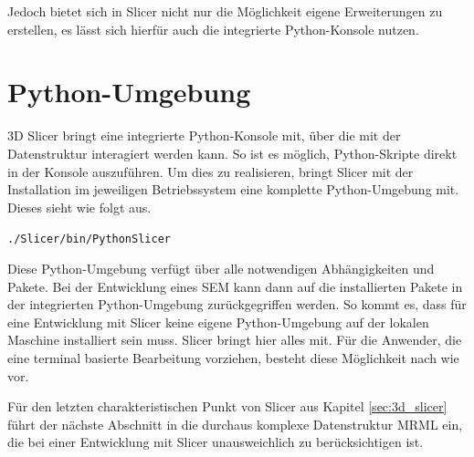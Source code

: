 Jedoch bietet sich in Slicer nicht nur die Möglichkeit eigene Erweiterungen zu erstellen,
es lässt sich hierfür auch die integrierte Python-Konsole nutzen.

\section{Python-Umgebung}
\label{subsec:pythob_umgebung} 3D Slicer bringt eine integrierte Python-Konsole
mit, über die mit der Datenstruktur interagiert werden kann. So ist es möglich, Python-Skripte
direkt in der Konsole auszuführen. Um dies zu realisieren, bringt Slicer mit der
Installation im jeweiligen Betriebssystem eine komplette Python-Umgebung mit.
Dieses sieht wie folgt aus.

\begin{center}
	\texttt{./Slicer/bin/PythonSlicer}
\end{center}

Diese Python-Umgebung verfügt über alle notwendigen Abhängigkeiten und Pakete.
Bei der Entwicklung eines \ac{SEM} kann dann auf die installierten Pakete in der
integrierten Python-Umgebung zurückgegriffen werden. So kommt es, dass für eine Entwicklung
mit Slicer keine eigene Python-Umgebung auf der lokalen Maschine installiert sein
muss. Slicer bringt hier alles mit. Für die Anwender, die eine terminal basierte
Bearbeitung vorziehen, besteht diese Möglichkeit nach wie vor.

Für den letzten charakteristischen Punkt von Slicer aus Kapitel \ref{sec:3d_slicer}
führt der nächste Abschnitt in die durchaus komplexe Datenstruktur \ac{MRML} ein,
die bei einer Entwicklung mit Slicer unausweichlich zu berücksichtigen ist.

